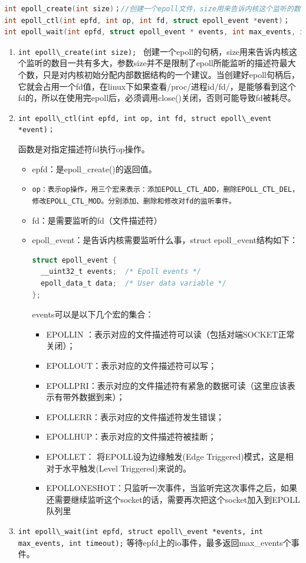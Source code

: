 \documentclass[format=final, language=chinese, degree=fyp]{hustthesis}
\begin{document}
\begin{lstlisting}[language=c]
int epoll_create(int size)；//创建一个epoll文件，size用来告诉内核这个监听的数目一共有多大
int epoll_ctl(int epfd, int op, int fd, struct epoll_event *event)；
int epoll_wait(int epfd, struct epoll_event * events, int max_events, int timeout);
\end{lstlisting}

\begin{enumerate}
	\item \lstinline {int epoll\_create(int size); }
创建一个epoll的句柄，size用来告诉内核这个监听的数目一共有多大，参数size并不是限制了epoll所能监听的描述符最大个数，只是对内核初始分配内部数据结构的一个建议。当创建好epoll句柄后，它就会占用一个fd值，在linux下如果查看/proc/进程id/fd/，是能够看到这个fd的，所以在使用完epoll后，必须调用close()关闭，否则可能导致fd被耗尽。

	\item \lstinline {int epoll\_ctl(int epfd, int op, int fd, struct epoll\_event *event)；}

函数是对指定描述符fd执行op操作。
	\begin{itemize}
		\item epfd：是epoll\_create()的返回值。\label{item:2}
		\item \verb|op：表示op操作，用三个宏来表示：添加EPOLL_CTL_ADD，删除EPOLL_CTL_DEL，修改EPOLL_CTL_MOD。分别添加、删除和修改对fd的监听事件。|
		\item fd：是需要监听的fd（文件描述符）
		\item epoll\_event：是告诉内核需要监听什么事，struct epoll\_event结构如下：
		\begin{lstlisting}[language=c]
struct epoll_event {
  __uint32_t events;  /* Epoll events */
  epoll_data_t data;  /* User data variable */
};
		\end{lstlisting}
	events可以是以下几个宏的集合：
		\begin{itemize}
			\item EPOLLIN ：表示对应的文件描述符可以读（包括对端SOCKET正常关闭）；\label{item:3}
			\item EPOLLOUT：表示对应的文件描述符可以写；
			\item EPOLLPRI：表示对应的文件描述符有紧急的数据可读（这里应该表示有带外数据到来）；
			\item EPOLLERR：表示对应的文件描述符发生错误；
			\item EPOLLHUP：表示对应的文件描述符被挂断；
			\item EPOLLET： 将EPOLL设为边缘触发(Edge Triggered)模式，这是相对于水平触发(Level Triggered)来说的。
			\item EPOLLONESHOT：只监听一次事件，当监听完这次事件之后，如果还需要继续监听这个socket的话，需要再次把这个socket加入到EPOLL队列里
		\end{itemize}
	\end{itemize}
	\item \lstinline {int epoll\_wait(int epfd, struct epoll\_event *events, int max_events, int timeout);}
等待epfd上的io事件，最多返回max\_events个事件。


\end{enumerate}
\end{document}
